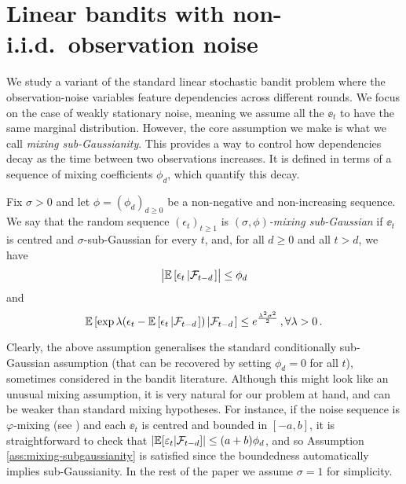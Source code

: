 
\section{Linear bandits with non-i.i.d.~observation noise} \label{sec:contrib} 
We study a variant of the standard linear stochastic bandit problem where the observation-noise variables feature 
dependencies across different rounds. We focus on the case of weakly stationary noise, meaning we assume all the $\ee_t$ to have the same marginal distribution. %
However, the core assumption we make is what we call \emph{mixing sub-Gaussianity}. This provides a way to control how dependencies decay as the time between two 
observations increases. It is defined in terms of a sequence of mixing coefficients $\phi_d$, which quantify this decay. \begin{assumption}
\label{ass:mixing-subgaussianity}
Fix $\sigma>0$ and let $\phi = (\phi_d)_{d\geq 0}$ be a non-negative and non-increasing sequence. We say that the random sequence $(\epsilon_t)_{t\geq 1}$ is \emph{$(\sigma, \phi)$-mixing sub-Gaussian} if $\ee_t$ is centred and $\sigma$-sub-Gaussian for every $t$, and, for all $d\geq 0$ and all $t>d$, we have
\begin{equation}
\label{eq::mixing}
    \bigl|\mathbb{E}\left[\epsilon_t\left|\mathcal{F}_{t-d}\right.\right] \bigr| \leq \phi_d
\end{equation}
and
\begin{equation}
\label{eq::mixing-subgaussianity}
   \mathbb{E}\left[\exp{\lambda(\epsilon_t-\mathbb{E}\left[\epsilon_t\left|\mathcal{F}_{t-d}\right.\right])}\left|\mathcal{F}_{t-d}\right.\right]\leq e^{\frac{\lambda^2\sigma^2}{2}}\,,
 \forall \lambda>0\,.
\end{equation}
\end{assumption}

Clearly, the above assumption generalises the standard conditionally sub-Gaussian assumption (that can be recovered by 
setting $\phi_d=0$ for all $t$), sometimes considered in the bandit literature. Although this might look like an 
unusual mixing assumption, it is very natural for our problem at hand, and can be weaker than standard mixing 
hypotheses. For instance, if the noise sequence is $\varphi$-mixing (see \citealp{bradley2005basic}) and each $\ee_t$ 
is centred and bounded in $[-a,b]$, it is straightforward to check that $|\mathbb{E}[\varepsilon_t|\mathcal{F}_{t-d}]| \leq (a+b)\phi_d$, and so 
Assumption \ref{ass:mixing-subgaussianity} is satisfied since the boundedness automatically implies sub-Gaussianity. In the rest of the paper we assume $\sigma =1$ for simplicity.


